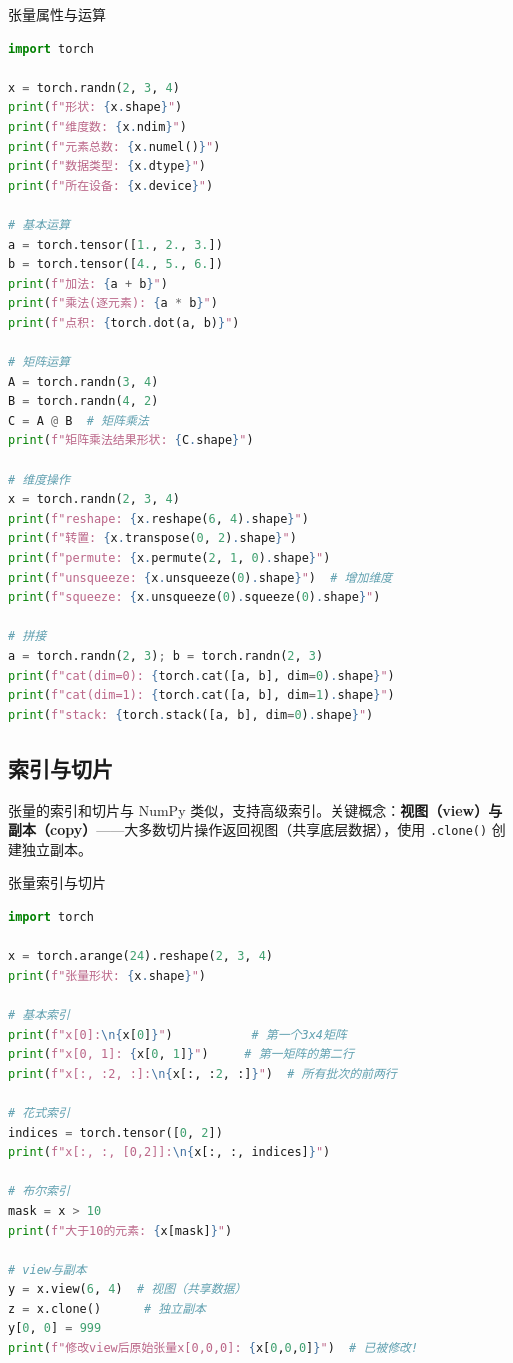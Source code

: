 \begin{mycode}{张量属性与运算}
\begin{lstlisting}[language=Python]
import torch

x = torch.randn(2, 3, 4)
print(f"形状: {x.shape}")
print(f"维度数: {x.ndim}")
print(f"元素总数: {x.numel()}")
print(f"数据类型: {x.dtype}")
print(f"所在设备: {x.device}")

# 基本运算
a = torch.tensor([1., 2., 3.])
b = torch.tensor([4., 5., 6.])
print(f"加法: {a + b}")
print(f"乘法(逐元素): {a * b}")
print(f"点积: {torch.dot(a, b)}")

# 矩阵运算
A = torch.randn(3, 4)
B = torch.randn(4, 2)
C = A @ B  # 矩阵乘法
print(f"矩阵乘法结果形状: {C.shape}")

# 维度操作
x = torch.randn(2, 3, 4)
print(f"reshape: {x.reshape(6, 4).shape}")
print(f"转置: {x.transpose(0, 2).shape}")
print(f"permute: {x.permute(2, 1, 0).shape}")
print(f"unsqueeze: {x.unsqueeze(0).shape}")  # 增加维度
print(f"squeeze: {x.unsqueeze(0).squeeze(0).shape}")

# 拼接
a = torch.randn(2, 3); b = torch.randn(2, 3)
print(f"cat(dim=0): {torch.cat([a, b], dim=0).shape}")
print(f"cat(dim=1): {torch.cat([a, b], dim=1).shape}")
print(f"stack: {torch.stack([a, b], dim=0).shape}")
\end{lstlisting}
\end{mycode}

\subsection{索引与切片}

张量的索引和切片与 NumPy 类似，支持高级索引。关键概念：\textbf{视图（view）与副本（copy）}——大多数切片操作返回视图（共享底层数据），使用 \texttt{.clone()} 创建独立副本。

\begin{mycode}{张量索引与切片}
\begin{lstlisting}[language=Python]
import torch

x = torch.arange(24).reshape(2, 3, 4)
print(f"张量形状: {x.shape}")

# 基本索引
print(f"x[0]:\n{x[0]}")           # 第一个3x4矩阵
print(f"x[0, 1]: {x[0, 1]}")     # 第一矩阵的第二行
print(f"x[:, :2, :]:\n{x[:, :2, :]}")  # 所有批次的前两行

# 花式索引
indices = torch.tensor([0, 2])
print(f"x[:, :, [0,2]]:\n{x[:, :, indices]}")

# 布尔索引
mask = x > 10
print(f"大于10的元素: {x[mask]}")

# view与副本
y = x.view(6, 4)  # 视图（共享数据）
z = x.clone()      # 独立副本
y[0, 0] = 999
print(f"修改view后原始张量x[0,0,0]: {x[0,0,0]}")  # 已被修改!
\end{lstlisting}
\end{mycode}

